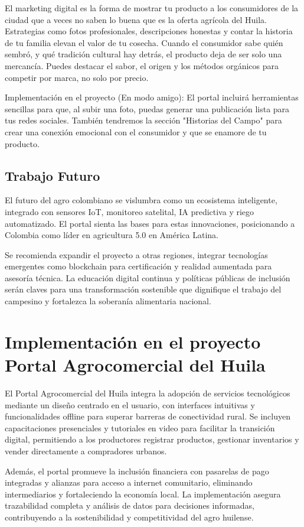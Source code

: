 El marketing digital es la forma de mostrar tu producto a los consumidores de la ciudad que a veces no saben lo buena que es la oferta agrícola del Huila. Estrategias como fotos profesionales, descripciones honestas y contar la historia de tu familia elevan el valor de tu cosecha. Cuando el consumidor sabe quién sembró, y qué tradición cultural hay detrás, el producto deja de ser solo una mercancía. Puedes destacar el sabor, el origen y los métodos orgánicos para competir por marca, no solo por precio.

Implementación en el proyecto (En modo amigo): El portal incluirá herramientas sencillas para que, al subir una foto, puedas generar una publicación lista para tus redes sociales. También tendremos la sección "Historias del Campo" para crear una conexión emocional con el consumidor y que se enamore de tu producto.

\subsection{Trabajo Futuro}
El futuro del agro colombiano se vislumbra como un ecosistema inteligente, integrado con sensores IoT, monitoreo satelital, IA predictiva y riego automatizado. El portal sienta las bases para estas innovaciones, posicionando a Colombia como líder en agricultura 5.0 en América Latina.

Se recomienda expandir el proyecto a otras regiones, integrar tecnologías emergentes como blockchain para certificación y realidad aumentada para asesoría técnica. La educación digital continua y políticas públicas de inclusión serán claves para una transformación sostenible que dignifique el trabajo del campesino y fortalezca la soberanía alimentaria nacional.

\section{Implementación en el proyecto Portal Agrocomercial del Huila}

El Portal Agrocomercial del Huila integra la adopción de servicios tecnológicos mediante un diseño centrado en el usuario, con interfaces intuitivas y funcionalidades offline para superar barreras de conectividad rural. Se incluyen capacitaciones presenciales y tutoriales en video para facilitar la transición digital, permitiendo a los productores registrar productos, gestionar inventarios y vender directamente a compradores urbanos.

Además, el portal promueve la inclusión financiera con pasarelas de pago integradas y alianzas para acceso a internet comunitario, eliminando intermediarios y fortaleciendo la economía local. La implementación asegura trazabilidad completa y análisis de datos para decisiones informadas, contribuyendo a la sostenibilidad y competitividad del agro huilense.